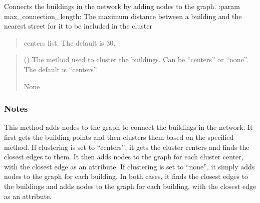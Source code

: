 \documentclass[letterpaper,10pt,english]{sphinxmanual}
\begin{document}
\begin{fulllineitems}
\begin{fulllineitems}
\label{\detokenize{pysewer:pysewer.preprocessing.ModelDomain.connect_buildings}}
\pysigstartsignatures
{}
\pysigstopsignatures
\sphinxAtStartPar
Connects the buildings in the network by adding nodes to the graph.
:param max\_connection\_length: The maximum distance between a building and the nearest street for it to be included in the cluster
\begin{quote}

\sphinxAtStartPar
centers list. The default is 30.
\end{quote}
\begin{quote}\begin{description}
\sphinxAtStartPar
{} (\sphinxstyleliteralemphasis{\sphinxupquote{, }}) \textendash{} The method used to cluster the buildings. Can be “centers” or “none”. The default is “centers”.

\sphinxAtStartPar
None

\end{description}\end{quote}
\subsubsection*{Notes}

\sphinxAtStartPar
This method adds nodes to the graph to connect the buildings in the network. It first gets the building points
and then clusters them based on the specified method. If clustering is set to “centers”, it gets the cluster
centers and finds the closest edges to them. It then adds nodes to the graph for each cluster center, with the
closest edge as an attribute. If clustering is set to “none”, it simply adds nodes to the graph for each building.
In both cases, it finds the closest edges to the buildings and adds nodes to the graph for each building, with
the closest edge as an attribute.

\end{fulllineitems}
\end{fulllineitems}
\end{document}
